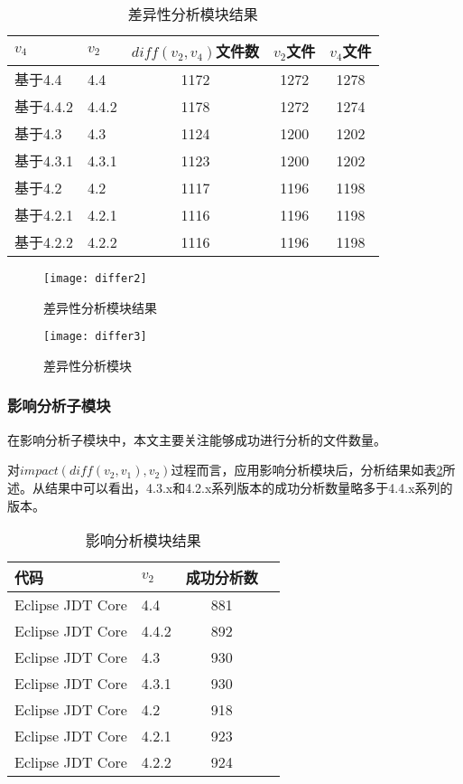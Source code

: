 \begin{table}[H]
	\caption{差异性分析模块结果}
	\label{data_differ_3}
	\centering
	\begin{tabular}{llccc}
		\toprule[1.5pt]
		{\heiti $v_4$} & {\heiti $v_2$} & {\heiti $diff(v_2,v_4)$文件数} & {\heiti $v_2$文件} & {\heiti $v_4$文件} \\\midrule[1pt]
		基于4.4 & 4.4	& 1172 & 1272 &	1278\\		
		基于4.4.2 & 4.4.2 & 1178 & 1272 & 1274		\\
		基于4.3 & 4.3 	 & 1124 & 1200	& 1202		\\
		基于4.3.1 & 4.3.1  & 1123 & 1200	& 1202		\\
		基于4.2 & 4.2 	& 1117 & 1196 & 1198		\\
		基于4.2.1 & 4.2.1 & 1116 & 1196	& 1198		\\
		基于4.2.2 & 4.2.2  & 1116 & 1196 & 1198		\\
		\bottomrule[1.5pt]
	\end{tabular}
\end{table}

\begin{figure}[H]
	\centering
	\texttt{[image: differ2]}
	\caption {差异性分析模块结果}
	\label {differ2}	
\end{figure}



\begin{figure}[H]
	\centering
	\texttt{[image: differ3]}
	\caption {差异性分析模块}
	\label {differ3}	
\end{figure}




\subsubsection{影响分析子模块}

在影响分析子模块中，本文主要关注能够成功进行分析的文件数量。

对$impact(diff(v_2,v_1),v_2)$过程而言，应用影响分析模块后，分析结果如表\ref {data_impact_1}所述。从结果中可以看出，4.3.x和4.2.x系列版本的成功分析数量略多于4.4.x系列的版本。

\begin{table}[H]
	\caption{影响分析模块结果}
	\label{data_impact_1}
	\centering
	\begin{tabular}{llcc}
		\toprule[1.5pt]
		{\heiti 代码} & {\heiti $v_2$} & {\heiti 成功分析数}  \\\midrule[1pt]
		Eclipse JDT Core & 4.4	 & 881	\\
		Eclipse JDT Core & 4.4.2 & 892 	\\
		Eclipse JDT Core & 4.3	 & 930		\\
		Eclipse JDT Core & 4.3.1 & 930 	\\
		Eclipse JDT Core & 4.2 	 &	918		\\
		Eclipse JDT Core & 4.2.1 & 923	\\
		Eclipse JDT Core & 4.2.2  & 924		\\
		\bottomrule[1.5pt]
	\end{tabular}
\end{table}

